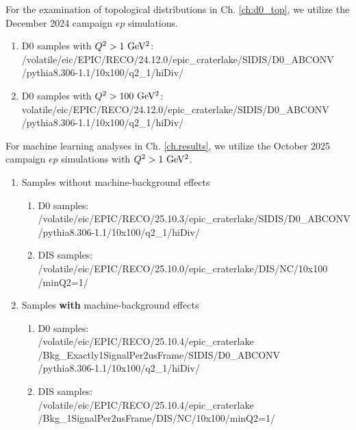 For the examination of topological distributions in Ch. \ref{ch:d0_top}, we utilize the December 2024 campaign $ep$ simulations.
\begin{enumerate}
    \item D0 samples with $Q^2>1~{\rm GeV^2}$: \\
    /volatile/eic/EPIC/RECO/24.12.0/epic\_craterlake/SIDIS/D0\_ABCONV\\/pythia8.306-1.1/10x100/q2\_1/hiDiv/
    
    \item D0 samples with $Q^2>100~{\rm GeV^2}$: \\
    volatile/eic/EPIC/RECO/24.12.0/epic\_craterlake/SIDIS/D0\_ABCONV\\/pythia8.306-1.1/10x100/q2\_1/hiDiv/
    
\end{enumerate}

For machine learning analyses in Ch. \ref{ch.results}, we utilize the October 2025 campaign $ep$ simulations with $Q^2>1~{\rm GeV^2}$.
\begin{enumerate}
    \item Samples without machine-background effects
    \begin{enumerate}
        \item D0 samples: \\
        /volatile/eic/EPIC/RECO/25.10.3/epic\_craterlake/SIDIS/D0\_ABCONV\\/pythia8.306-1.1/10x100/q2\_1/hiDiv/
        
        \item DIS samples: \\
        /volatile/eic/EPIC/RECO/25.10.0/epic\_craterlake/DIS/NC/10x100\\/minQ2=1/

    \end{enumerate}
    \item Samples \textbf{with} machine-background effects
    \begin{enumerate}
        \item D0 samples: \\
        /volatile/eic/EPIC/RECO/25.10.4/epic\_craterlake\\/Bkg\_Exactly1SignalPer2usFrame/SIDIS/D0\_ABCONV\\/pythia8.306-1.1/10x100/q2\_1/hiDiv/
        
        \item DIS samples: \\
        /volatile/eic/EPIC/RECO/25.10.4/epic\_craterlake\\/Bkg\_1SignalPer2usFrame/DIS/NC/10x100/minQ2=1/

    \end{enumerate}
\end{enumerate}

